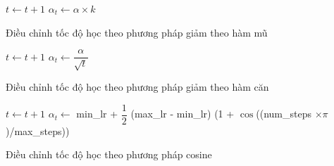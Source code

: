 \documentclass[14pt, a4paper]{article}
\theoremstyle{sltheorem}
\theoremstyle{soltheorem}
\begin{document}
\begin{algorithm}[h!]
    \DontPrintSemicolon
     {
        $t \gets t + 1$\;
         {
            $\alpha_t \gets \alpha \times k$\;
        } 
    }
    \caption{Điều chỉnh tốc độ học theo phương pháp giảm theo hàm mũ}
\end{algorithm}

\begin{algorithm}[h!]
    \DontPrintSemicolon
     {
        $t \gets t + 1$\;
        $\alpha_t \gets \dfrac{\alpha}{\sqrt{t}}$\;
    }
    \caption{Điều chỉnh tốc độ học theo phương pháp giảm theo hàm căn}
\end{algorithm}


\begin{algorithm}[h!]
    \DontPrintSemicolon
     {
        $t \gets t + 1$\;
        $\alpha_t \gets$ min\_lr + $\dfrac{1}{2}$ (max\_lr - min\_lr) (1 + $\cos$((num\_steps $\times \pi$)/max\_steps))\;
    }
    \caption{Điều chỉnh tốc độ học theo phương pháp cosine}
\end{algorithm}
\end{document}
